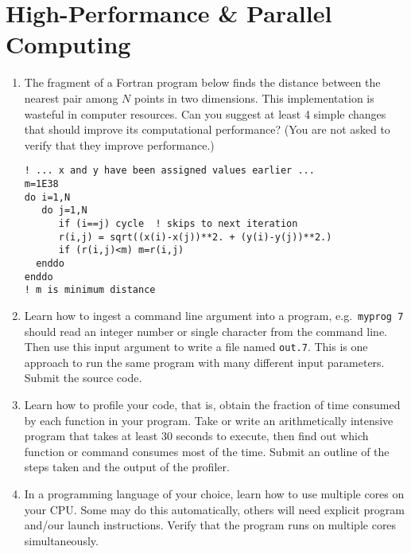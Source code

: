 \documentclass{article}
\begin{document}
\section{High-Performance \& Parallel Computing}
\begin{enumerate}
\item  %

The fragment of a Fortran program below finds the distance between the nearest pair among $N$ points in two dimensions.  This implementation is wasteful in computer resources.
Can you suggest at least 4 simple changes that should improve its computational performance?
(You are not asked to verify that they improve performance.)
\begin{verbatim}
! ... x and y have been assigned values earlier ...
m=1E38
do i=1,N
   do j=1,N
      if (i==j) cycle  ! skips to next iteration
      r(i,j) = sqrt((x(i)-x(j))**2. + (y(i)-y(j))**2.)
      if (r(i,j)<m) m=r(i,j)
  enddo
enddo
! m is minimum distance
\end{verbatim}


\item
  Learn how to ingest a command line argument into a program, e.g.\ {\tt myprog 7} should read an integer number or single character from the command line.
  Then use this input argument to write a file named {\tt out.7}.
This is one approach to run the same program with many different input parameters.
Submit the source code.

\item Learn how to profile your code, that is, obtain the fraction of time consumed by each function in your program. Take or write an arithmetically intensive program that takes at least 30 seconds to execute, then find out which function or command consumes most of the time.
Submit an outline of the steps taken and the output of the profiler.
  
\item
  In a programming language of your choice, learn how to use multiple cores on your CPU. Some may do this automatically, others will need explicit program and/our launch instructions.  Verify that the program runs on multiple cores simultaneously.
  
\end{enumerate}




\newpage
\end{document}
